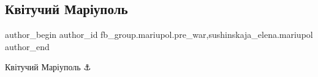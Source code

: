  
 
 
 
 

\subsection{Квітучий Маріуполь}
\label{sec:20_02_2023.fb.fb_group.mariupol.pre_war.2.kv_tuchii_mar_upol}
 
\ifcmt
 author_begin
   author_id fb_group.mariupol.pre_war,sushinskaja_elena.mariupol
 author_end
\fi

Квітучий Маріуполь ⚓

